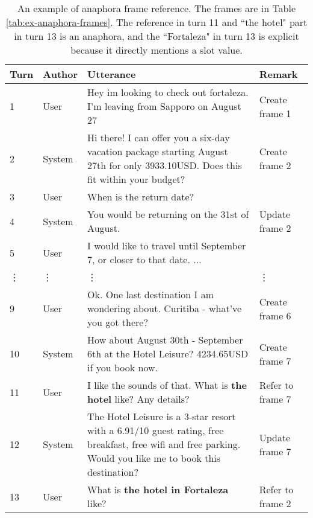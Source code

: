 \begin{table}
    \centering
    \caption[Anaphora frame reference]{An example of anaphora frame reference. The frames are in Table \ref{tab:ex-anaphora-frames}. The reference in turn 11 and ``the hotel" part in turn 13 is an anaphora, and the ``Fortaleza" in turn 13 is explicit because it directly mentions a slot value.}
    \label{tab:ex-anaphora}
    \begin{tabularx}{\textwidth}{llX|l}
        \toprule
        Turn & Author & Utterance & Remark \\
        \midrule
        1 & User & Hey im looking to check out fortaleza. I'm leaving from Sapporo on August 27 & Create frame 1 \\
        2 & System & Hi there! I can offer you a six-day vacation package starting August 27th for only 3933.10USD. Does this fit within your budget? & Create frame 2 \\
        3 & User & When is the return date? & \\
        4 & System & You would be returning on the 31st of August. & Update frame 2 \\
        5 & User & I would like to travel until September 7, or closer to that date. ... & \\
        \vdots & \vdots & \vdots & \vdots \\
        9 & User & Ok. One last destination I am wondering about. Curitiba - what've you got there? & Create frame 6 \\
        10 & System & How about August 30th - September 6th at the Hotel Leisure? 4234.65USD if you book now. & Create frame 7 \\
        11 & User & I like the sounds of that. What is \textbf{the hotel} like? Any details? & Refer to frame 7 \\
        12 & System & The Hotel Leisure is a 3-star resort with a 6.91/10 guest rating, free breakfast, free wifi and free parking. Would you like me to book this destination? & Update frame 7 \\
        13 & User & What is \textbf{the hotel in Fortaleza} like? & Refer to frame 2 \\
        \bottomrule
    \end{tabularx}
\end{table}

